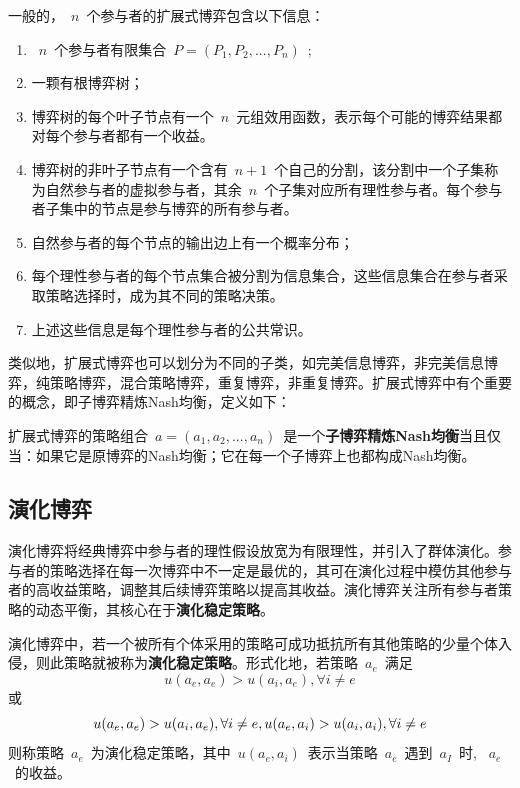 \begin{definition}
一般的，~$n$~个参与者的扩展式博弈包含以下信息：
\begin{enumerate}
	\item ~$n$~个参与者有限集合~$P=(P_1,P_2,...,P_n)$~;
	\item 一颗有根博弈树；
	\item 博弈树的每个叶子节点有一个~$n$~元组效用函数，表示每个可能的博弈结果都对每个参与者都有一个收益。
	\item 博弈树的非叶子节点有一个含有~$n+1$~个自己的分割，该分割中一个子集称为自然参与者的虚拟参与者，其余~$n$~个子集对应所有理性参与者。每个参与者子集中的节点是参与博弈的所有参与者。
	
	\item 自然参与者的每个节点的输出边上有一个概率分布；
	\item 每个理性参与者的每个节点集合被分割为信息集合，这些信息集合在参与者采取策略选择时，成为其不同的策略决策。
	\item 上述这些信息是每个理性参与者的公共常识。
\end{enumerate}
\end{definition}

类似地，扩展式博弈也可以划分为不同的子类，如完美信息博弈，非完美信息博弈，纯策略博弈，混合策略博弈，重复博弈，非重复博弈。扩展式博弈中有个重要的概念，即子博弈精炼Nash均衡，定义如下：
\begin{definition}
扩展式博弈的策略组合~$a=(a_1,a_2,...,a_n)$~是一个\textbf{子博弈精炼Nash均衡}当且仅当：如果它是原博弈的Nash均衡；它在每一个子博弈上也都构成Nash均衡。
\end{definition}
\subsection{演化博弈}

演化博弈将经典博弈中参与者的理性假设放宽为有限理性，并引入了群体演化。参与者的策略选择在每一次博弈中不一定是最优的，其可在演化过程中模仿其他参与者的高收益策略，调整其后续博弈策略以提高其收益。演化博弈关注所有参与者策略的动态平衡，其核心在于\textbf{演化稳定策略}。

\begin{definition}
	演化博弈中，若一个被所有个体采用的策略可成功抵抗所有其他策略的少量个体入侵，则此策略就被称为\textbf{演化稳定策略}。形式化地，若策略~$a_e$~满足
	\begin{equation}
	u(a_e,a_e) > u(a_i,a_e), \forall i \ne e 
	\end{equation}
	或
	\begin{equation}
	u(a_e,a_e) > u(a_i,a_e), \forall i \ne e,\\
	u(a_e,a_i) > u(a_i,a_i), \forall i \ne e 
	\end{equation}
	则称策略~$a_e$~为演化稳定策略，其中~$u(a_e,a_i)$~表示当策略~$a_e$~遇到~$a_I$~时, ~$a_e$~的收益。
	
\end{definition}


